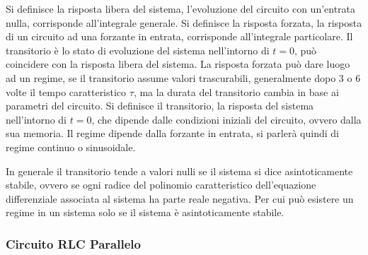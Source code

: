 \documentclass{article}
\numberwithin{equation}{subsection}
\begin{document}
Si definisce la risposta libera del sistema, l'evoluzione del circuito con un'entrata nulla, corrisponde all'integrale generale.  
Si definisce la risposta forzata, la risposta di un circuito ad una forzante in entrata, corrisponde all'integrale particolare. 
Il transitorio è lo stato di evoluzione del sistema nell'intorno di $t=0$, può coincidere con la risposta libera del sistema. 
La risposta forzata può dare luogo ad un regime, se il transitorio assume valori trascurabili, generalmente dopo $3$ o $6$ volte il tempo caratteristico $\tau$, 
ma la durata del transitorio cambia in base ai parametri del circuito. 
Si definisce il transitorio, la risposta del sistema nell'intorno di $t=0$, che 
dipende dalle condizioni iniziali del circuito, ovvero dalla sua memoria. Il regime dipende dalla forzante in entrata, si parlerà quindi di regime continuo o sinusoidale. 

In generale il transitorio tende a valori nulli se il sistema si dice asintoticamente stabile, ovvero se ogni radice del polinomio caratteristico dell'equazione 
differenziale associata al sistema ha parte reale negativa. Per cui può esistere un regime in un sistema solo se il sistema è asintoticamente stabile. 

\subsubsection{Circuito RLC Parallelo}
\end{document}

